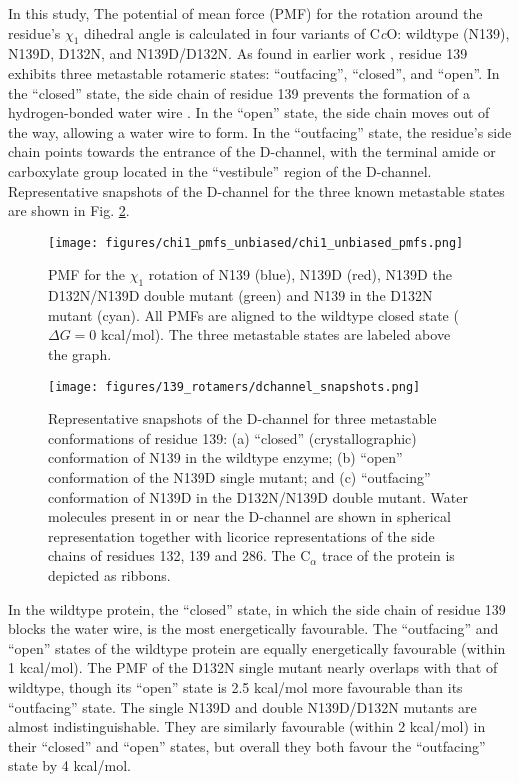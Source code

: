 In this study, The potential of mean force (PMF) for the rotation around the residue's $\chi_1$ dihedral angle is calculated in four variants of C\emph{c}O: wildtype (N139), N139D, D132N, and N139D/D132N. As found in earlier work \cite{Henry:2009p4543,Henry:2011p10221}, residue 139 exhibits three metastable rotameric states: ``outfacing'', ``closed'', and ``open''. In the ``closed'' state, the side chain of residue 139 prevents the formation of a hydrogen-bonded water wire \cite{Henry:2009p4543}. In the ``open'' state, the side chain moves out of the way, allowing a water wire to form. In the ``outfacing'' state, the residue's side chain points towards the entrance of the D-channel, with the terminal amide or carboxylate group located in the ``vestibule'' region of the D-channel. Representative snapshots of the D-channel for the three known metastable states are shown in Fig. \ref{fig:dchannel_snapshots}.

\begin{figure}[htbp]
\centering
\texttt{[image: figures/chi1\_pmfs\_unbiased/chi1\_unbiased\_pmfs.png]}
\caption[PMF for the $\chi_1$ rotation of the side chain of residue 139 in wildtype and mutant cytochrome \emph{c} oxidase.]{PMF for the $\chi_1$ rotation of N139 (blue), N139D (red), N139D the D132N/N139D double mutant (green) and N139 in the D132N mutant (cyan). All PMFs are aligned to the wildtype closed state ($\Delta G = 0$ kcal/mol). The three metastable states are labeled above the graph.}
\label{fig:pmf_chi1_unbiased}
\end{figure}

\begin{figure}[htbp]
\centering
\texttt{[image: figures/139\_rotamers/dchannel\_snapshots.png]}
\caption[Representative snapshots of the D-channel for three metastable conformations of residue 139.]{Representative snapshots of the D-channel for three metastable conformations of residue 139: (a) ``closed'' (crystallographic) conformation of N139 in the wildtype enzyme; (b) ``open'' conformation of the N139D single mutant; and (c) ``outfacing'' conformation of N139D in the D132N/N139D double mutant. Water molecules present in or near the D-channel are shown in spherical representation together with licorice representations of the side chains of residues 132, 139 and 286. The C$_\alpha$ trace of the protein is depicted as ribbons.}
\label{fig:dchannel_snapshots}
\end{figure}

In the wildtype protein, the ``closed'' state, in which the side chain of residue 139 blocks the water wire, is the most energetically favourable. The ``outfacing'' and ``open'' states of the wildtype protein are equally energetically favourable (within 1 kcal/mol). The PMF of the D132N single mutant nearly overlaps with that of wildtype, though its ``open'' state is 2.5 kcal/mol more favourable than its ``outfacing'' state. The single N139D and double N139D/D132N mutants are almost indistinguishable. They are similarly favourable (within 2 kcal/mol) in their ``closed'' and ``open'' states, but overall they both favour the ``outfacing'' state by 4 kcal/mol.

